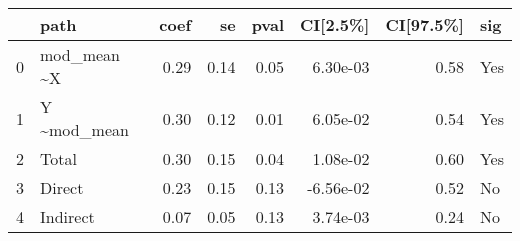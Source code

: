 \begin{tabular}{llrrrrrl}
\toprule
{} &          path &  coef &    se &  pval &  CI[2.5\%] &  CI[97.5\%] &  sig \\
\midrule
0 &  mod\_mean \textasciitilde  X &  0.29 &  0.14 &  0.05 &  6.30e-03 &       0.58 &  Yes \\
1 &  Y \textasciitilde  mod\_mean &  0.30 &  0.12 &  0.01 &  6.05e-02 &       0.54 &  Yes \\
2 &         Total &  0.30 &  0.15 &  0.04 &  1.08e-02 &       0.60 &  Yes \\
3 &        Direct &  0.23 &  0.15 &  0.13 & -6.56e-02 &       0.52 &   No \\
4 &      Indirect &  0.07 &  0.05 &  0.13 &  3.74e-03 &       0.24 &   No \\
\bottomrule
\end{tabular}
